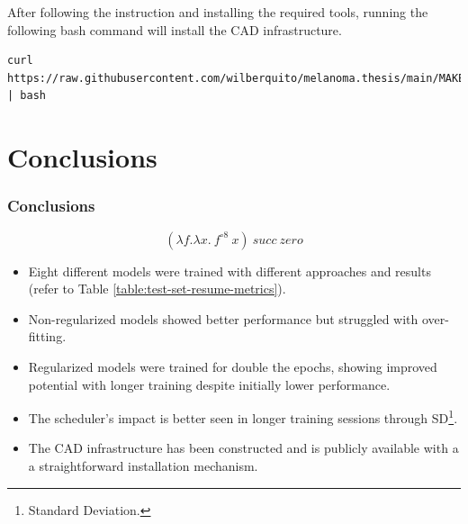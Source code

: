 \documentclass[dvipsnames,mathserif]{beamer}
\begin{document}
{\begin{frame}[fragile]
      After following the instruction and installing the required tools,
      running the following bash command will install the CAD infrastructure.

      \vspace{0.1cm}

      \begin{Verbatim}[fontsize=\tiny]
curl https://raw.githubusercontent.com/wilberquito/melanoma.thesis/main/MAKE.sh | bash
      \end{Verbatim}

    \end{frame}


    \section{Conclusions}


    \begin{frame}
      \frametitle{Conclusions}


      \[(\lambda f. \lambda x.\ f^{\circ 8}\ x)\ succ\ zero\]
    \end{frame}

    \begin{frame}
      \begin{itemize}
        \item Eight different models were trained with different approaches and results (refer to Table \ref{table:test-set-resume-metrics}).
        \item Non-regularized models showed better performance but struggled with over-fitting.
        \item Regularized models were trained for double the epochs, showing
          improved potential with longer training despite initially lower
          performance.
        \item The scheduler's impact is better seen in longer training sessions through SD\footnote{Standard Deviation.}.
        \item The CAD infrastructure has been constructed and is publicly available
          with a a straightforward installation mechanism.
      \end{itemize}




\end{frame}}
\end{document}
